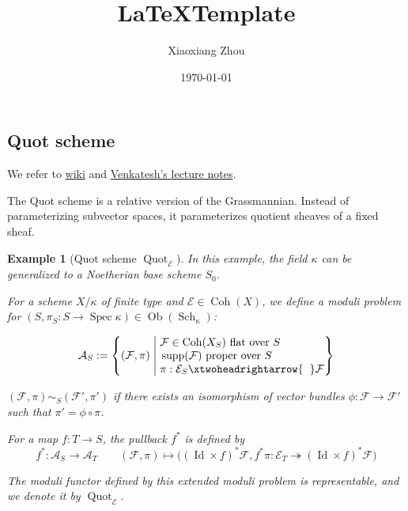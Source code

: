 \documentclass[UTF8]{amsart}
\numberwithin{equation}{section}
\theoremstyle{plain}
\newtheorem{eg}[theorem]{Example}
\numberwithin{equation}{section}
\theoremstyle{remark}
\DeclareMathOperator{\Id}{\operatorname{Id}}	%
\DeclareMathOperator{\Ob}{\operatorname{Ob}}
\DeclareMathOperator{\supp}{\operatorname{supp}}
\DeclareMathOperator{\Spec}{\operatorname{Spec}}
\DeclareMathOperator{\Coh}{\operatorname{Coh}}
\DeclareMathOperator{\Quot}{\operatorname{Quot}}
\DeclareMathOperator{\Sch}{\operatorname{Sch}}
\begin{document}
\date{\today}

\title
{\LaTeX\;Template
}
\author{Xiaoxiang Zhou}
\address{Institut für Mathematik\\
Humboldt-Universität zu Berlin\\
Berlin, 12489\\ Germany\\} 


\maketitle
\tableofcontents


\subsection{Quot scheme}
We refer to \href{https://en.wikipedia.org/wiki/Quot_scheme}{wiki} and \href{https://gauss.math.yale.edu/~il282/Siddharth_S16.pdf}{Venkatesh's lecture notes}.

The Quot scheme is a relative version of the Grassmannian. Instead of parameterizing subvector spaces, it parameterizes quotient sheaves of a fixed sheaf.

\begin{eg}[Quot scheme $\Quot_{\mathcal{E}}$]
In this example, the field $\kappa$ can be generalized to a Noetherian base scheme $S_0$.

For a scheme $X/\kappa$ of finite type and $\mathcal{E} \in \Coh(X)$, we define a moduli problem for $(S,\pi_S: S \longrightarrow \Spec \kappa) \in \Ob(\Sch_{\kappa})$:

$$\mathcal{A}_S:=\left\{(\mathcal{F},\pi)  \;\middle|\; \begin{aligned}
&\\[-5mm]
&\mathcal{F} \in \Coh(X_S) \text{ flat over $S$ }\\[-1mm]
&\supp(\mathcal{F})  \text{ proper over $S$ }\\[-1mm]
& \pi:\mathcal{E}_S \xtwoheadrightarrow{\hspace{2mm}}  \mathcal{F}
\end{aligned}
 \right\}$$
 
   $(\mathcal{F},\pi) \sim_S (\mathcal{F}',\pi')$ if there exists an isomorphism of vector bundles $\phi:\mathcal{F} \longrightarrow \mathcal{F}'$ such that $\pi'=\phi \circ \pi$.
   
   For a map $f:T \longrightarrow S$, the pullback $f^*$ is defined by
      $$f^*:\mathcal{A}_S \longrightarrow \mathcal{A}_T \qquad (\mathcal{F},\pi) \longmapsto \big((\Id \times f)^*\mathcal{F},f^* \pi:\mathcal{E}_T \twoheadrightarrow (\Id \times f)^*\mathcal{F}\big)$$
      
      The moduli functor defined by this extended moduli problem is representable, and we denote it by $\Quot_{\mathcal{E}}$.
\end{eg}
\end{document}
